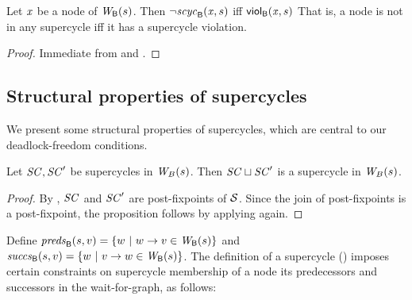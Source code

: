 \begin{proposition} \label{prop:scViol-iff-notInSC}
Let $\mathit{x}$ be a node of $\mathit{W}_{\mathsf{B}}({s})$. Then $\neg \mathit{scyc}_{\mathsf{B}}({\mathit{x}, s})$ iff $\mathsf{viol}_{\mathsf{B}}(\mathit{x},s)$ %
That is, a node is not in any supercycle iff it has a supercycle violation.
\end{proposition}
%
\begin{proof}
Immediate from  and .
\end{proof}








\subsection{Structural properties of supercycles}
\label{secn:supercycle-structural}


We present some structural properties of supercycles, which
are central to our deadlock-freedom conditions.


\begin{proposition} \label{prop:supercycle:union}
Let $\mathit{SC}, \mathit{SC}'$ be supercycles in $\mathit{W}_{B}({s})$. Then $\mathit{SC} \sqcup \mathit{SC}'$ is
a supercycle in $\mathit{W}_{B}({s})$.
\end{proposition}
%
\begin{proof}
By , $\mathit{SC}$ and $\mathit{SC}'$ are post-fixpoints of $\mathcal{S}$. Since the join of post-fixpoints is a post-fixpoint, 
the proposition follows by applying  again.
\end{proof}





Define
$\mathit{preds}_{\mathsf{B}}({s, v}) = \{ w ~|~ w \rightarrow v \in \mathit{W}_{\mathsf{B}}({s}) \}$ and 
$\mathit{succs}_{\mathsf{B}}({s, v}) = \{ w ~|~ v \rightarrow w \in \mathit{W}_{\mathsf{B}}({s}) \}$.
The definition of a supercycle () 
imposes certain constraints on supercycle membership of a node \wrt its predecessors and successors
in the wait-for-graph, as follows:

